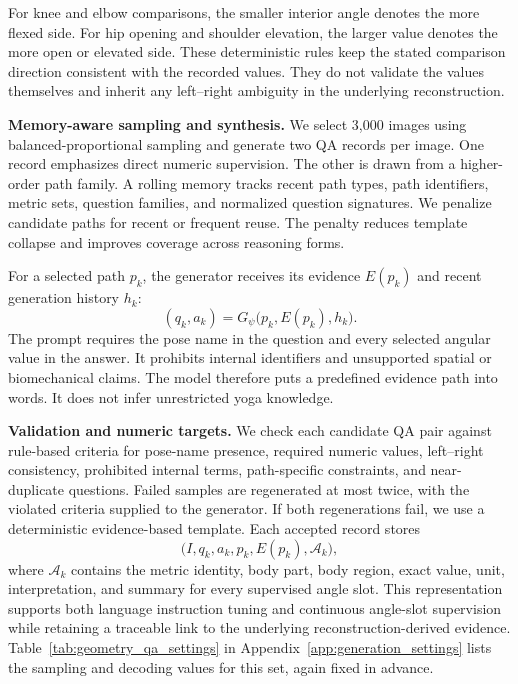 For knee and elbow comparisons, the smaller interior angle denotes the more flexed side.
For hip opening and shoulder elevation, the larger value denotes the more open or elevated side.
These deterministic rules keep the stated comparison direction consistent with the recorded values.
They do not validate the values themselves and inherit any left--right ambiguity in the underlying reconstruction.

\noindent\textbf{Memory-aware sampling and synthesis.}
We select 3,000 images using balanced-proportional sampling and generate two QA records per image.
One record emphasizes direct numeric supervision.
The other is drawn from a higher-order path family.
A rolling memory tracks recent path types, path identifiers, metric sets, question families, and normalized question signatures.
We penalize candidate paths for recent or frequent reuse.
The penalty reduces template collapse and improves coverage across reasoning forms.

For a selected path $p_k$, the generator receives its evidence $E(p_k)$ and recent generation history $h_k$:
\begin{equation}
(q_k,a_k)=G_{\psi}\bigl(p_k,E(p_k),h_k\bigr).
\label{eq:geometry_qa}
\end{equation}
The prompt requires the pose name in the question and every selected angular value in the answer.
It prohibits internal identifiers and unsupported spatial or biomechanical claims.
The model therefore puts a predefined evidence path into words.
It does not infer unrestricted yoga knowledge.

\noindent\textbf{Validation and numeric targets.}
We check each candidate QA pair against rule-based criteria for pose-name presence, required numeric values, left--right consistency, prohibited internal terms, path-specific constraints, and near-duplicate questions.
Failed samples are regenerated at most twice, with the violated criteria supplied to the generator.
If both regenerations fail, we use a deterministic evidence-based template.
Each accepted record stores
\begin{equation}
\bigl(I,q_k,a_k,p_k,E(p_k),\mathcal{A}_k\bigr),
\label{eq:geometry_record}
\end{equation}
where $\mathcal{A}_k$ contains the metric identity, body part, body region, exact value, unit, interpretation, and summary for every supervised angle slot.
This representation supports both language instruction tuning and continuous angle-slot supervision while retaining a traceable link to the underlying reconstruction-derived evidence.
Table~\ref{tab:geometry_qa_settings} in Appendix~\ref{app:generation_settings} lists the sampling and decoding values for this set, again fixed in advance.

